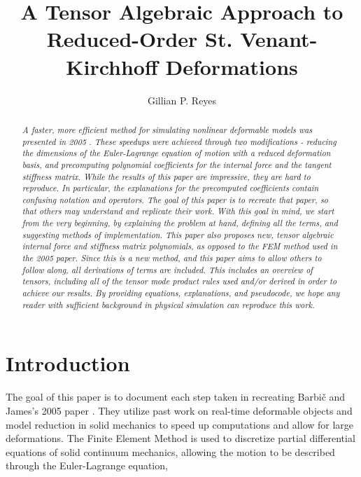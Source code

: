 \documentclass[twocolumn,10pt]{asme2ej}
\title{A Tensor Algebraic Approach to Reduced-Order St. Venant-Kirchhoff Deformations}
\author{Gillian P. Reyes
}
\begin{document}
\maketitle

\begin{abstract}
{\it A faster, more efficient method for simulating nonlinear deformable models was presented in 2005 \cite{barbic}. These speedups were achieved through two modifications - reducing the dimensions of the Euler-Lagrange equation of motion with a reduced deformation basis, and precomputing polynomial coefficients for the internal force and the tangent stiffness matrix. While the results of this paper are impressive, they are hard to reproduce. In particular, the explanations for the precomputed coefficients contain confusing notation and operators. The goal of this paper is to recreate that paper, so that others may understand and replicate their work. With this goal in mind, we start from the very beginning, by explaining the problem at hand, defining all the terms, and suggesting methods of implementation. This paper also proposes new, tensor algebraic internal force and stiffness matrix polynomials, as opposed to the FEM method used in the 2005 paper. Since this is a new method, and this paper aims to allow others to follow along, all derivations of terms are included. This includes an overview of tensors, including all of the tensor mode product rules used and/or derived in order to achieve our results. By providing equations, explanations, and pseudocode, we hope any reader with sufficient background in physical simulation can reproduce this work.

}
\end{abstract}

\section{Introduction}

The goal of this paper is to document each step taken in recreating Barbič and James's 2005
paper \cite{barbic}. They utilize past work on real-time deformable objects and model reduction in solid mechanics to speed up computations and allow for large deformations. The Finite Element Method is used to discretize partial differential equations of solid continuum mechanics, allowing the motion to be described through the Euler-Lagrange equation,
\end{document}
